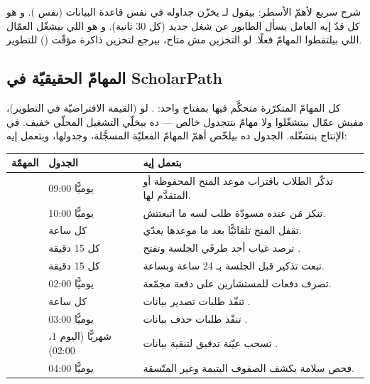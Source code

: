 شرح سريع لأهمّ الأسطر:  بيقول لـ يخزّن جداوله في
نفس قاعدة البيانات (نفس ). و هو كل قدّ إيه
العامل يسأل الطابور عن شغل جديد (كل 30 ثانية). و هو اللي بيشغّل
العمّال اللي بيلتقطوا المهامّ فعلًا. لو التخزين مش متاح، بيرجع لتخزين ذاكرة مؤقّت
() للتطوير.

\subsection{المهامّ الحقيقيّة في ScholarPath}

كل المهامّ المتكرّرة متحكَّم فيها بمفتاح واحد: . لو 
(القيمة الافتراضيّة في التطوير)، مفيش عمّال بيتشغّلوا ولا مهامّ بتتجدول خالص — ده بيخلّي
التشغيل المحلّي خفيف. في الإنتاج بنشغّله. الجدول ده بيلخّص أهمّ المهامّ الفعليّة المسجَّلة،
وجدولها، وبتعمل إيه:

\begin{center}
\begin{tabular}{L{3.7cm} L{2.7cm} L{7.6cm}}
\toprule
المهمّة & الجدول & بتعمل إيه \\
\midrule
{} & يوميًّا 09:00 & تذكّر الطلاب باقتراب موعد المنح المحفوظة أو المتقدَّم لها. \\
 & يوميًّا 10:00 & تنكز مَن عنده مسودّة طلب لسه ما اتبعتتش. \\
 & كل ساعة & تقفل المنح تلقائيًّا بعد ما موعدها يعدّي. \\
 & كل 15 دقيقة & ترصد غياب أحد طرفَي الجلسة وتفتح . \\
 & كل 15 دقيقة & تبعت تذكير قبل الجلسة بـ 24 ساعة وبساعة. \\
 & يوميًّا 02:00 & تصرف دفعات  للمستشارين على دفعة مجمّعة. \\
 & كل ساعة & تنفّذ طلبات تصدير بيانات . \\
 & يوميًّا 03:00 & تنفّذ طلبات حذف بيانات . \\
 & شهريًّا (اليوم 1، 02:00) & تسحب عيّنة تدقيق لتنقية بيانات . \\
 & يوميًّا 04:00 & فحص سلامة يكشف الصفوف اليتيمة وغير المتّسقة. \\
\bottomrule
\end{tabular}
\end{center}

